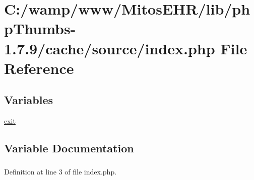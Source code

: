 \hypertarget{lib_2php_thumbs-1_87_89_2cache_2source_2index_8php}{\section{\-C\-:/wamp/www/\-Mitos\-E\-H\-R/lib/php\-Thumbs-\/1.7.9/cache/source/index.php \-File \-Reference}
\label{lib_2php_thumbs-1_87_89_2cache_2source_2index_8php}
}
\subsection*{\-Variables}
\begin{DoxyCompactItemize}
\item 
\hyperlink{lib_2php_thumbs-1_87_89_2cache_2source_2index_8php_a6733eb5f605d09eaede9845835d71c4e}{exit}
\end{DoxyCompactItemize}


\subsection{\-Variable \-Documentation}
\hypertarget{lib_2php_thumbs-1_87_89_2cache_2source_2index_8php_a6733eb5f605d09eaede9845835d71c4e}{
\subsubsection[{exit}]{}}\label{lib_2php_thumbs-1_87_89_2cache_2source_2index_8php_a6733eb5f605d09eaede9845835d71c4e}


\-Definition at line 3 of file index.\-php.

